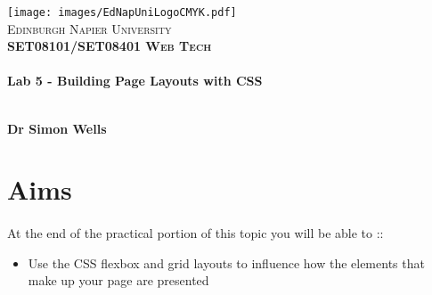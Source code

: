 \documentclass[10pt, a4paper]{article}
\begin{document}

\begin{titlepage}
\vspace*{5cm}
\begin{center}
\texttt{[image: images/EdNapUniLogoCMYK.pdf]}~\\[1cm]

\textsc{\Large Edinburgh Napier University}\\[1.5cm]

\textsc{\LARGE \bfseries SET08101/SET08401 Web Tech}\\[0.5cm]

\hrulefill \\[0.4cm]
{\huge \bfseries Lab 5 - Building Page Layouts with CSS\\[0.4cm] }
\hrulefill \\[1.5cm]

\begin{minipage}{0.4\textwidth}
\begin{flushleft} \large
\textbf{Dr Simon Wells} \\
\end{flushleft}
\end{minipage}

\vfill

\end{center}
\end{titlepage}




%

\section*{Aims}
\paragraph{} At the end of the practical portion of this topic you will be able to ::

\begin{itemize}
    \item Use the CSS flexbox and grid layouts to influence how the elements that make up your page are presented
\end{itemize}
\end{document}
